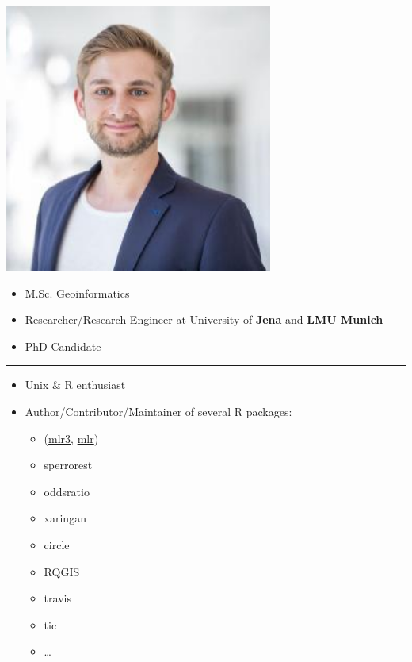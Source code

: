 \documentclass[]{book}
\providecommand{\tightlist}{%
  \setlength{\itemsep}{0pt}\setlength{\parskip}{0pt}}
\begin{document}
\begin{flushright}\includegraphics[width=3.47in]{img/pjs} \end{flushright}

\begin{itemize}
\tightlist
\item
  M.Sc. Geoinformatics
\item
  Researcher/Research Engineer at University of \textbf{Jena} and \textbf{LMU Munich}
\item
  PhD Candidate
\end{itemize}

\begin{center}\rule{0.5\linewidth}{\linethickness}\end{center}

\begin{itemize}
\tightlist
\item
  Unix \& R enthusiast
\item
  Author/Contributor/Maintainer of several R packages:

  \begin{itemize}
  \tightlist
  \item
    (\href{https://github.com/mlr-org/mlr3}{mlr3}, \href{https://github.com/mlr-org/mlr}{mlr})
  \item
    sperrorest
  \item
    oddsratio
  \item
    xaringan
  \item
    circle
  \item
    RQGIS
  \item
    travis
  \item
    tic
  \item
    \ldots{}
  \end{itemize}
\end{itemize}
\end{document}
